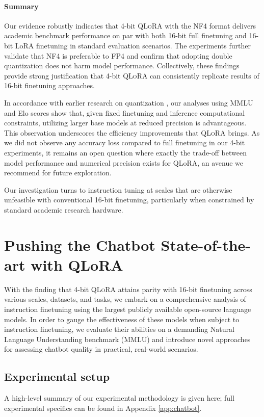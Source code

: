 \paragraph{Summary} Our evidence robustly indicates that 4-bit \textsc{QLoRA} with the NF4 format delivers academic benchmark performance on par with both 16-bit full finetuning and 16-bit LoRA finetuning in standard evaluation scenarios. The experiments further validate that NF4 is preferable to FP4 and confirm that adopting double quantization does not harm model performance. Collectively, these findings provide strong justification that 4-bit \textsc{QLoRA} can consistently replicate results of 16-bit finetuning approaches.

In accordance with earlier research on quantization \citep{dettmers2022case}, our analyses using MMLU and Elo scores show that, given fixed finetuning and inference computational constraints, utilizing larger base models at reduced precision is advantageous. This observation underscores the efficiency improvements that \textsc{QLoRA} brings. As we did not observe any accuracy loss compared to full finetuning in our 4-bit experiments, it remains an open question where exactly the trade-off between model performance and numerical precision exists for QLoRA, an avenue we recommend for future exploration.

Our investigation turns to instruction tuning at scales that are otherwise unfeasible with conventional 16-bit finetuning, particularly when constrained by standard academic research hardware.

\section{Pushing the Chatbot State-of-the-art with QLoRA}
\label{sec:pushing}
With the finding that 4-bit \textsc{QLoRA} attains parity with 16-bit finetuning across various scales, datasets, and tasks, we embark on a comprehensive analysis of instruction finetuning using the largest publicly available open-source language models. In order to gauge the effectiveness of these models when subject to instruction finetuning, we evaluate their abilities on a demanding Natural Language Understanding benchmark (MMLU) and introduce novel approaches for assessing chatbot quality in practical, real-world scenarios.

\subsection{Experimental setup}
A high-level summary of our experimental methodology is given here; full experimental specifics can be found in Appendix \ref{app:chatbot}.

